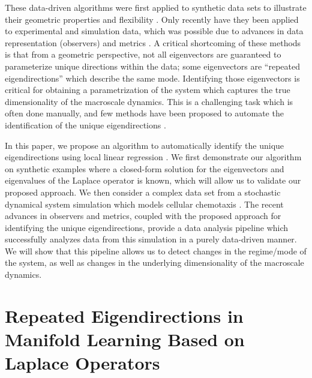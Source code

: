 %
These data-driven algorithms were first applied to synthetic data sets to illustrate their geometric properties and flexibility \cite{coifman2005geometric, nadler2006diffusion}.
%
Only recently have they been applied to experimental and simulation data, which was possible due to advances in data representation (observers) and metrics \cite{rubner2000earth,mallat2012group,talmon2013empirical,zhao2014rotationally, rohrdanz2011determination}.
%
A critical shortcoming of these methods is that from a geometric perspective, not all eigenvectors are guaranteed to parameterize unique directions within the data; some eigenvectors are ``repeated eigendirections'' which describe the same mode.
%
Identifying those eigenvectors is critical for obtaining a parametrization of the system which captures the true dimensionality of the macroscale dynamics.
%
This is a challenging task which is often done manually, and few methods have been proposed to automate the identification of the unique eigendirections \cite{gerber2007robust}.

In this paper, we propose an algorithm to automatically identify the unique eigendirections using local linear regression \cite{wasserman2006all}.
%
We first demonstrate our algorithm on synthetic examples where a closed-form solution for the eigenvectors and eigenvalues of the Laplace operator is known, which will allow us to validate our proposed approach.
%
We then consider a complex data set from a stochastic dynamical system simulation which models cellular chemotaxis \cite{othmer1988models}.
%
The recent advances in observers and metrics, coupled with the proposed approach for identifying the unique eigendirections, provide a data analysis pipeline which successfully analyzes data from this simulation in a purely data-driven manner.
%
We will show that this pipeline allows us to detect changes in the regime/mode of the system, as well as changes in the underlying dimensionality of the macroscale dynamics.


\section{Repeated Eigendirections in Manifold Learning Based on Laplace Operators}


